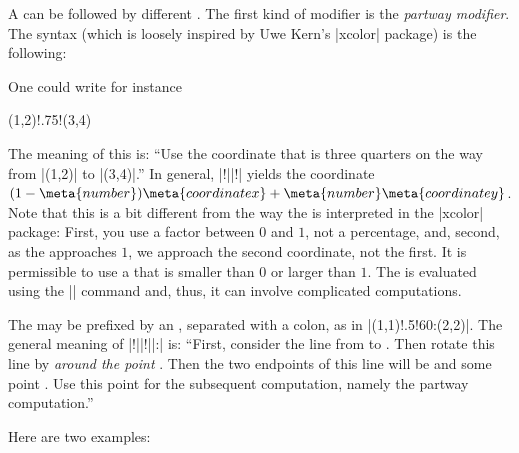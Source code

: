 A  can be followed by different . The first
kind of modifier is the \emph{partway modifier}. The syntax (which is loosely
inspired by Uwe Kern's |xcolor| package) is the following:
%
\begin{quote}
\end{quote}
%
One could write for instance
%
\begin{codeexample}
(1,2)!.75!(3,4)
\end{codeexample}
%
The meaning of this is: ``Use the coordinate that is three quarters on the way
from |(1,2)| to |(3,4)|.'' In general, |!||!| yields the coordinate $(1 -
\meta{number})\meta{coordinate x} + \meta{number} \meta{coordinate y}$. Note
that this is a bit different from the way the  is interpreted in
the |xcolor| package: First, you use a factor between $0$ and $1$, not a
percentage, and, second, as the  approaches $1$, we approach the
second coordinate, not the first. It is permissible to use a  that
is smaller than $0$ or larger than $1$. The  is evaluated using
the |\pgfmathparse| command and, thus, it can involve complicated computations.
%
\begin{codeexample}[]
\end{codeexample}

The  may be prefixed by an , separated with
a colon, as in |(1,1)!.5!60:(2,2)|. The general meaning of
|!||!||:| is: ``First, consider the
line from  to . Then rotate this line by 
\emph{around the point }. Then the two endpoints of this line will be
 and some point . Use this point  for the subsequent
computation, namely the partway computation.''

Here are two examples:
%
\begin{codeexample}[]
\end{codeexample}

